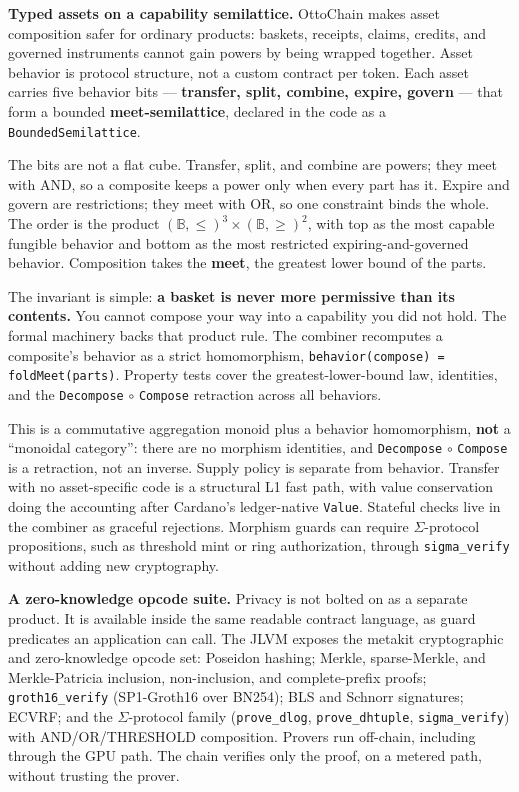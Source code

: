 \documentclass[11pt,a4paper]{article}
\begin{document}
\textbf{Typed assets on a capability semilattice.} OttoChain makes asset composition safer for ordinary products: baskets, receipts, claims, credits, and governed instruments cannot gain powers by being wrapped together. Asset behavior is protocol structure, not a custom contract per token. Each asset carries five behavior bits --- \textbf{transfer, split, combine, expire, govern} --- that form a bounded \textbf{meet-semilattice}, declared in the code as a \texttt{BoundedSemilattice}.

The bits are not a flat cube. Transfer, split, and combine are powers; they meet with AND, so a composite keeps a power only when every part has it. Expire and govern are restrictions; they meet with OR, so one constraint binds the whole. The order is the product $(\mathbb{B},\leq)^3 \times (\mathbb{B},\geq)^2$, with top as the most capable fungible behavior and bottom as the most restricted expiring-and-governed behavior. Composition takes the \textbf{meet}, the greatest lower bound of the parts.

The invariant is simple: \textbf{a basket is never more permissive than its contents.} You cannot compose your way into a capability you did not hold. The formal machinery backs that product rule. The combiner recomputes a composite's behavior as a strict homomorphism, \texttt{behavior(compose) = foldMeet(parts)}. Property tests cover the greatest-lower-bound law, identities, and the \texttt{Decompose} $\circ$ \texttt{Compose} retraction across all behaviors.

This is a commutative aggregation monoid plus a behavior homomorphism, \textbf{not} a ``monoidal category'': there are no morphism identities, and \texttt{Decompose} $\circ$ \texttt{Compose} is a retraction, not an inverse. Supply policy is separate from behavior. Transfer with no asset-specific code is a structural L1 fast path, with value conservation doing the accounting after Cardano's ledger-native \texttt{Value}. Stateful checks live in the combiner as graceful rejections. Morphism guards can require $\Sigma$-protocol propositions, such as threshold mint or ring authorization, through \texttt{sigma\_verify} without adding new cryptography.

\textbf{A zero-knowledge opcode suite.} Privacy is not bolted on as a separate product. It is available inside the same readable contract language, as guard predicates an application can call. The JLVM exposes the metakit cryptographic and zero-knowledge opcode set: Poseidon hashing; Merkle, sparse-Merkle, and Merkle-Patricia inclusion, non-inclusion, and complete-prefix proofs; \texttt{groth16\_verify} (SP1-Groth16 over BN254); BLS and Schnorr signatures; ECVRF; and the $\Sigma$-protocol family (\texttt{prove\_dlog}, \texttt{prove\_dhtuple}, \texttt{sigma\_verify}) with AND/OR/THRESHOLD composition. Provers run off-chain, including through the GPU path. The chain verifies only the proof, on a metered path, without trusting the prover.
\end{document}
